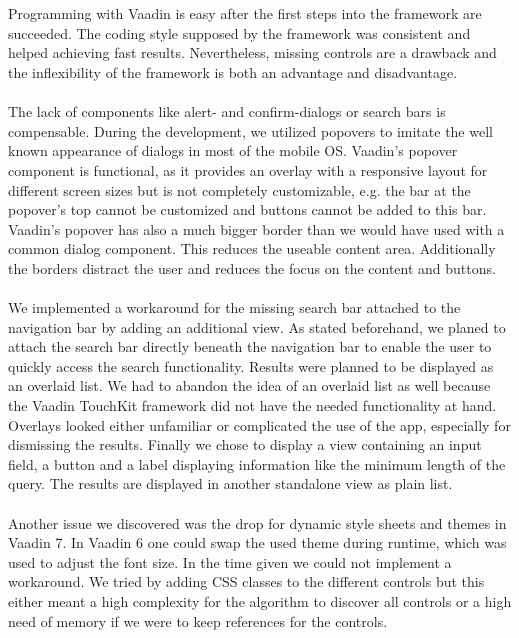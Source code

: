 \\
\\
Programming with Vaadin is easy after the first steps into the framework are succeeded. The coding style supposed by the framework was consistent and helped achieving fast results. Nevertheless, missing controls are a drawback and the inflexibility of the framework is both an advantage and disadvantage. 
\\
\\
The lack of components like alert- and confirm-dialogs or search bars is compensable. During the development, we utilized popovers to imitate the well known appearance of dialogs in most of the mobile OS. Vaadin's popover component is functional, as it provides an overlay with a responsive layout for different screen sizes but is not completely customizable, e.g. the bar at the popover's top cannot be customized and buttons cannot be added to this bar. Vaadin's popover has also a much bigger border than we would have used with a common dialog component. This reduces the useable content area. Additionally the borders distract the user and reduces the focus on the content and buttons.
\\
\\
We implemented a workaround for the missing search bar attached to the navigation bar by adding an additional view. As stated beforehand, we planed to attach the search bar directly beneath the navigation bar to enable the user to quickly access the search functionality. Results were planned to be displayed as an overlaid list. We had to abandon the idea of an overlaid list as well because the Vaadin TouchKit framework did not have the needed functionality at hand. Overlays looked either unfamiliar or complicated the use of the app, especially for dismissing the results. Finally we chose to display a view containing an input field, a button and a label displaying information like the minimum length of the query. The results are displayed in another standalone view as plain list.
\\
\\
Another issue we discovered was the drop for dynamic style sheets and themes in Vaadin 7. In Vaadin 6 one could swap the used theme during runtime, which was used to adjust the font size. In the time given we could not implement a workaround. We tried by adding CSS classes to the different controls but this either meant a high complexity for the algorithm to discover all controls or a high need of memory if we were to keep references for the controls.
\\
